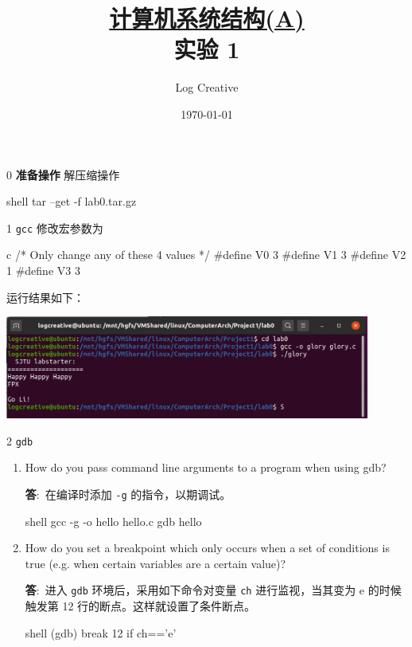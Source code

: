 \documentclass[12pt,a4paper]{article}
\newenvironment{problems}{\begin{list}{}{\renewcommand{\makelabel}[1]{\textbf{##1}.\hfil}}}{\end{list}}
\providecommand{\ans}{\textbf{答}:~}
\begin{document}
\title{\normalsize \underline{计算机系统结构(A)}\\\LARGE 实验 1}
\author{Log Creative }
\date{\today}
\maketitle

\begin{problems}
    \item[0] \textbf{准备操作}
    解压缩操作
    \begin{code}{shell}
        tar --get -f lab0.tar.gz
    \end{code}
    \item[1] \texttt{gcc} 修改宏参数为
    \begin{code}{c}
/* Only change any of these 4 values */
#define V0 3
#define V1 3
#define V2 1
#define V3 3
    \end{code}
    运行结果如下：

    \includegraphics[width=0.9\textwidth]{gcc.png}

    \item[2] \texttt{gdb}
    \begin{enumerate}[(1)]
        \item How do you pass command line arguments to a program when using gdb?
        
        \ans 在编译时添加 \texttt{-g} 的指令，以期调试。
        \begin{code}{shell}
            gcc -g -o hello hello.c
            gdb hello
        \end{code}

        \item How do you set a breakpoint which only occurs when a set of conditions is true (e.g. when certain variables are a certain value)?
        
        \ans 进入 \texttt{gdb} 环境后，采用如下命令对变量 \texttt{ch} 进行监视，当其变为 e 的时候触发第 12 行的断点。这样就设置了条件断点。
        \begin{code}{shell}
            (gdb) break 12 if ch=='e'
        \end{code}


\end{enumerate}
\end{problems}
\end{document}
